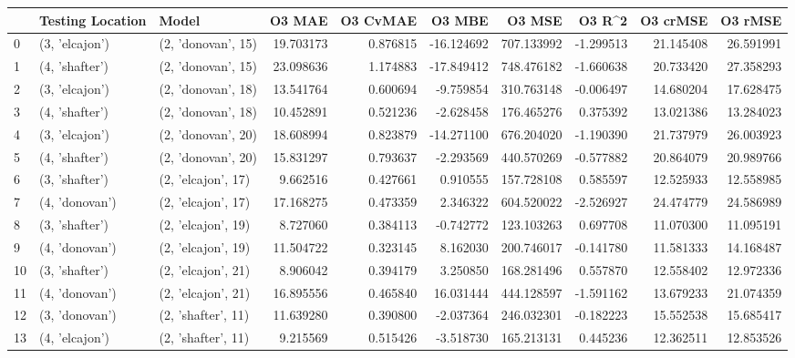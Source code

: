 \begin{tabular}{lllrrrrrrr}
\toprule
{} & Testing Location &               Model &     O3 MAE &  O3 CvMAE &     O3 MBE &       O3 MSE &    O3 R\textasciicircum2 &   O3 crMSE &    O3 rMSE \\
\midrule
0  &   (3, 'elcajon') &  (2, 'donovan', 15) &  19.703173 &  0.876815 & -16.124692 &   707.133992 & -1.299513 &  21.145408 &  26.591991 \\
1  &   (4, 'shafter') &  (2, 'donovan', 15) &  23.098636 &  1.174883 & -17.849412 &   748.476182 & -1.660638 &  20.733420 &  27.358293 \\
2  &   (3, 'elcajon') &  (2, 'donovan', 18) &  13.541764 &  0.600694 &  -9.759854 &   310.763148 & -0.006497 &  14.680204 &  17.628475 \\
3  &   (4, 'shafter') &  (2, 'donovan', 18) &  10.452891 &  0.521236 &  -2.628458 &   176.465276 &  0.375392 &  13.021386 &  13.284023 \\
4  &   (3, 'elcajon') &  (2, 'donovan', 20) &  18.608994 &  0.823879 & -14.271100 &   676.204020 & -1.190390 &  21.737979 &  26.003923 \\
5  &   (4, 'shafter') &  (2, 'donovan', 20) &  15.831297 &  0.793637 &  -2.293569 &   440.570269 & -0.577882 &  20.864079 &  20.989766 \\
6  &   (3, 'shafter') &  (2, 'elcajon', 17) &   9.662516 &  0.427661 &   0.910555 &   157.728108 &  0.585597 &  12.525933 &  12.558985 \\
7  &   (4, 'donovan') &  (2, 'elcajon', 17) &  17.168275 &  0.473359 &   2.346322 &   604.520022 & -2.526927 &  24.474779 &  24.586989 \\
8  &   (3, 'shafter') &  (2, 'elcajon', 19) &   8.727060 &  0.384113 &  -0.742772 &   123.103263 &  0.697708 &  11.070300 &  11.095191 \\
9  &   (4, 'donovan') &  (2, 'elcajon', 19) &  11.504722 &  0.323145 &   8.162030 &   200.746017 & -0.141780 &  11.581333 &  14.168487 \\
10 &   (3, 'shafter') &  (2, 'elcajon', 21) &   8.906042 &  0.394179 &   3.250850 &   168.281496 &  0.557870 &  12.558402 &  12.972336 \\
11 &   (4, 'donovan') &  (2, 'elcajon', 21) &  16.895556 &  0.465840 &  16.031444 &   444.128597 & -1.591162 &  13.679233 &  21.074359 \\
12 &   (3, 'donovan') &  (2, 'shafter', 11) &  11.639280 &  0.390800 &  -2.037364 &   246.032301 & -0.182223 &  15.552538 &  15.685417 \\
13 &   (4, 'elcajon') &  (2, 'shafter', 11) &   9.215569 &  0.515426 &  -3.518730 &   165.213131 &  0.445236 &  12.362511 &  12.853526 \\

\end{tabular}
